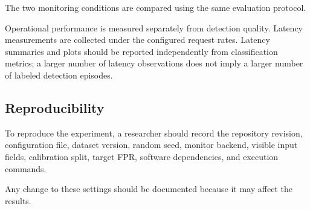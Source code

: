 The two monitoring conditions are compared using the same
evaluation protocol.

Operational performance is measured separately from detection
quality. Latency measurements are collected under the configured
request rates. Latency summaries and plots should be reported
independently from classification metrics; a larger number of
latency observations does not imply a larger number of labeled
detection episodes.

\subsection{Reproducibility}

To reproduce the experiment, a researcher should record the
repository revision, configuration file, dataset version, random
seed, monitor backend, visible input fields, calibration split,
target FPR, software dependencies, and execution commands.

Any change to these settings should be documented because it may
affect the results.
